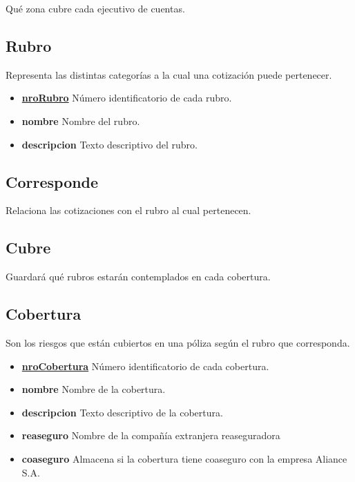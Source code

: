 \documentclass[a4paper,11pt]{article}
\begin{document}
Qué zona cubre cada ejecutivo de cuentas.

\subsection{Rubro}

Representa las distintas categorías a la cual una cotización puede pertenecer.

\begin{itemize}
   
  \item \textbf{\uline{nroRubro}} Número identificatorio de cada rubro.
  
  \item \textbf{nombre} Nombre del rubro.

  \item \textbf{descripcion} Texto descriptivo del rubro.
  
\end{itemize}

\subsection{Corresponde}

Relaciona las cotizaciones con el rubro al cual pertenecen.

\subsection{Cubre}

Guardará qué rubros estarán contemplados en cada cobertura.

\subsection{Cobertura}

Son los riesgos que están cubiertos en una póliza según el rubro que corresponda.

\begin{itemize}
   
  \item \textbf{\uline{nroCobertura}} Número identificatorio de cada cobertura.
  
  \item \textbf{nombre} Nombre de la cobertura.

  \item \textbf{descripcion} Texto descriptivo de la cobertura.
  
  \item \textbf{reaseguro} Nombre de la compañía extranjera reaseguradora

  \item \textbf{coaseguro} Almacena si la cobertura tiene coaseguro con la empresa Aliance S.A.
  
\end{itemize}
\end{document}
